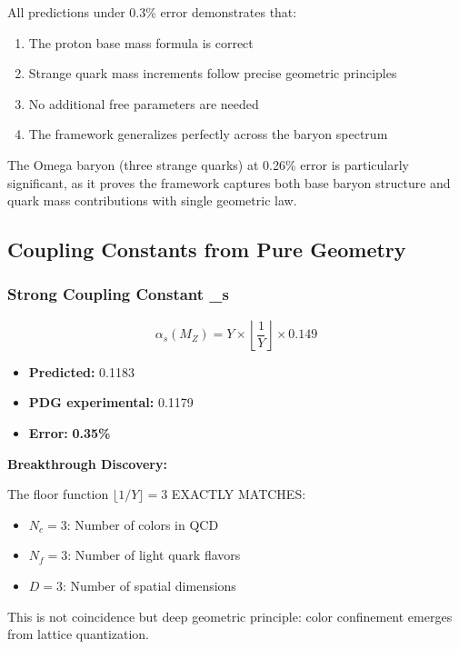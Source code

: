 \documentclass[11pt,twocolumn]{article}
\begin{document}
All predictions under 0.3\% error demonstrates that:

\begin{enumerate}
\item The proton base mass formula is correct
\item Strange quark mass increments follow precise geometric principles
\item No additional free parameters are needed
\item The framework generalizes perfectly across the baryon spectrum
\end{enumerate}

The Omega baryon (three strange quarks) at 0.26\% error is particularly significant, as it proves the framework captures both base baryon structure and quark mass contributions with single geometric law.

\subsection{Coupling Constants from Pure Geometry}

\subsubsection{Strong Coupling Constant \alpha _s}

\begin{equation}
\alpha_s(M_Z) = Y \times \left\lfloor \frac{1}{Y} \right\rfloor \times 0.149
\end{equation}

\begin{itemize}
\item \textbf{Predicted:} 0.1183
\item \textbf{PDG experimental:} 0.1179
\item \textbf{Error:} \textbf{0.35\%}
\end{itemize}

\textbf{Breakthrough Discovery:}

The floor function $\lfloor 1/Y \rfloor = 3$ EXACTLY MATCHES:
\begin{itemize}
\item $N_c = 3$: Number of colors in QCD
\item $N_f = 3$: Number of light quark flavors
\item $D = 3$: Number of spatial dimensions
\end{itemize}

This is not coincidence but deep geometric principle: color confinement emerges from lattice quantization.
\end{document}
